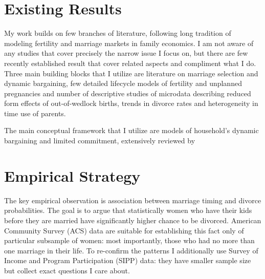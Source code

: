 \documentclass[12pt,letter]{article}
\begin{document}


\section{Existing Results}

My work builds on few branches of literature, following long tradition of modeling fertility and marriage markets in family economics. I am not aware of any studies that cover precisely the narrow issue I focus on, but there are few recently established result that cover related aspects and compliment what I do. Three main building blocks that I utilize are literature on marriage selection and dynamic bargaining, few detailed lifecycle models of fertility and unplanned pregnancies and number of descriptive studies of microdata describing reduced form effects of out-of-wedlock births, trends in divorce rates and heterogeneity in time use of parents.

The main conceptual framework that I utilize are models of household's dynamic bargaining and limited commitment, extensively reviewed by 




\section{Empirical Strategy}
The key empirical observation is association between marriage timing and divorce probabilities. The goal is to argue that statistically women who have their kids before they are married have significantly higher chance to be divorced. American Community Survey (ACS) data are suitable for establishing this fact only of particular subsample of women: most importantly, those who had no more than one marriage in their life. To re-confirm the patterns I additionally use Survey of Income and Program Participation (SIPP) data: they have smaller sample size but collect exact questions I care about.
\end{document}
